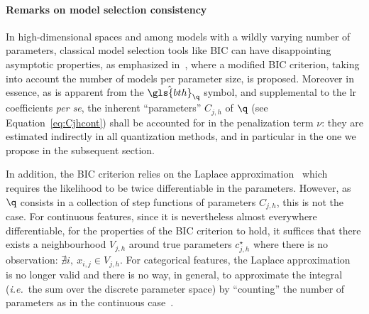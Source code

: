\paragraph{Remarks on model selection consistency} \label{par:consistency}

In high-dimensional spaces and among models with a wildly varying number of parameters, classical model selection tools like BIC can have disappointing asymptotic properties, as emphasized in~\cite{chen2008extended}, where a modified BIC criterion, taking into account the number of models per parameter size, is proposed.
Moreover in essence, as is apparent from the $\hat{\gls{bth}}_{\q}$ symbol, and supplemental to the \gls{lr} coefficients \textit{per se}, the inherent ``parameters'' $C_{j,h}$ of $\q$ (see Equation~\eqref{eq:Cjhcont}) shall be accounted for in the penalization term $\nu$: they are estimated indirectly in all quantization methods, and in particular in the one we propose in the subsequent section.

In addition, the BIC criterion relies on the Laplace approximation~\cite{lebarbier} which requires the likelihood to be twice differentiable in the parameters. However, as $\q$ consists in a collection of step functions of parameters $C_{j,h}$, this is not the case. For continuous features, since it is nevertheless almost everywhere differentiable, for the properties of the BIC criterion to hold, it suffices that there exists a neighbourhood $V_{j,h}$ around true parameters $c_{j,h}^\star$ where there is no observation: $\nexists i, \: x_{i,j} \in V_{j,h}$. For categorical features, the Laplace approximation~\cite{lebarbier} is no longer valid and there is no way, in general, to approximate the integral (\textit{i.e.}\ the sum over the discrete parameter space) by ``counting'' the number of parameters as in the continuous case~\cite{vincent_disc}.


